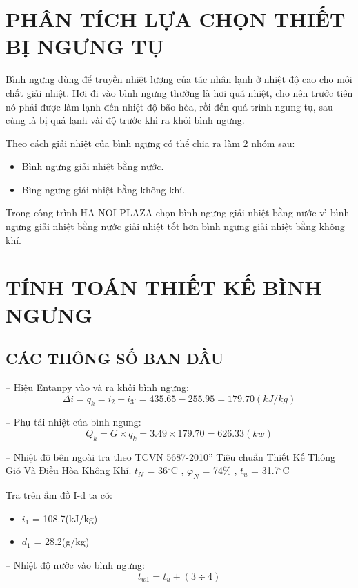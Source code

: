 \section{PHÂN TÍCH LỰA CHỌN THIẾT BỊ NGƯNG TỤ}
Bình ngưng dùng để truyền nhiệt lượng của tác nhân lạnh ở nhiệt độ cao cho môi chất giải nhiệt. Hơi đi vào bình ngưng thường là hơi quá nhiệt, cho nên trước tiên nó phải được làm lạnh đến nhiệt độ bão hòa, rồi đến quá trình ngưng tụ, sau cùng là bị quá lạnh vài độ trước khi ra khỏi bình ngưng.

Theo cách giải nhiệt của bình ngưng có thể chia ra làm 2 nhóm sau:
\begin{itemize}
	\item Bình ngưng giải nhiệt bằng nước.
	\item Bìng ngưng giải nhiệt bằng không khí.
\end{itemize}

Trong công trình HA NOI PLAZA chọn bình ngưng giải nhiệt bằng nước vì bình ngưng giải nhiệt bằng nước giải nhiệt tốt hơn bình ngưng giải nhiệt bằng không khí.
\section{TÍNH TOÁN THIẾT KẾ BÌNH NGƯNG}
\subsection{CÁC THÔNG SỐ BAN ĐẦU}
-- Hiệu Entanpy vào và ra khỏi bình ngưng:
\begin{equation*}
	\Delta i = q_{k} = i_{2} - i_{3'} = 435.65 - 255.95 = 179.70(kJ/kg)
\end{equation*}

-- Phụ tải nhiệt của bình ngưng:
\begin{equation*}
    Q_{k} = G\times q_{k} = 3.49 \times 179.70 = 626.33(kw)
\end{equation*}

-- Nhiệt độ bên ngoài tra theo TCVN 5687-2010” Tiêu chuẩn Thiết Kế Thông Gió Và Điều Hòa Không Khí.
$t_{N}$ = 36$^{\circ}$C , $\varphi_{N}$ = 74\% , $t_{u}$ = 31.7$^{\circ}$C 

Tra trên ẩm đồ I-d ta có:
\begin{itemize}
	\item $i_{1}$ =  108.7(kJ/kg)
	\item $d_{1}$ =  28.2(g/kg)
\end{itemize}

-- Nhiệt độ nước vào bình ngưng:
\begin{equation*}
	t_{w1} = t_{u} + (3\div 4)
\end{equation*}

